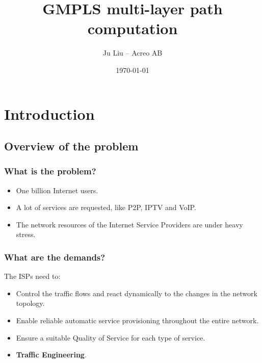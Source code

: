 \documentclass{beamer}
\title{GMPLS multi-layer path computation}
\author{Ju Liu -- Acreo AB}
\date{\today}
\begin{document}
\frame{\titlepage}

\section[Outline]{}
\frame{\tableofcontents}

\section{Introduction}
\subsection{Overview of the problem}
\frame
{
  \frametitle{What is the problem?}

  \begin{itemize}
  \item<1-> One billion Internet users.
  \item<2-> A lot of services are requested, like P2P, IPTV and VoIP.
  \item<3-> The network resources of the Internet Service Providers
    are under heavy stress.
  \end{itemize}
}
\frame
{
  \frametitle{What are the demands?}

  The ISPs need to:  
  \begin{itemize}
  \item<1-> Control the traffic flows and react dynamically to the
    changes in the network topology.
  \item<2-> Enable reliable automatic service provisioning throughout
    the entire network.
  \item<3-> Ensure a suitable Quality of Service for each type of
    service.
  \item<4-> \textbf{Traffic Engineering}.
  \end{itemize}
}
\end{document}
